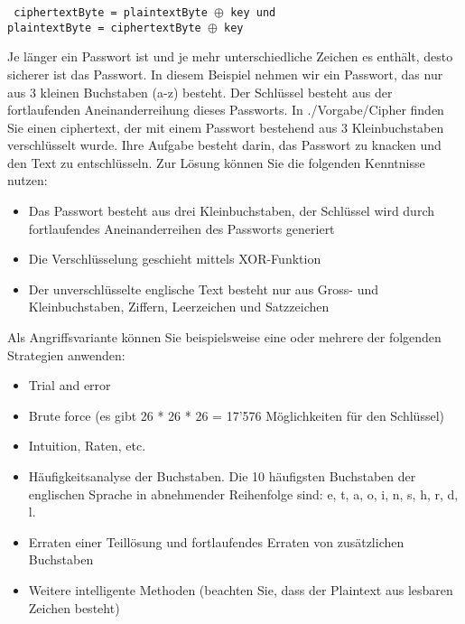 

\noindent
\texttt{
ciphertextByte = plaintextByte $\oplus$ key und \\
plaintextByte = ciphertextByte $\oplus$ key}

Je länger ein Passwort ist und je mehr unterschiedliche Zeichen es enthält, desto sicherer ist das Passwort.
In diesem Beispiel nehmen wir ein Passwort, das nur aus 3 kleinen Buchstaben (a-z) besteht. Der Schlüssel
besteht aus der fortlaufenden Aneinanderreihung dieses Passworts.
In ./Vorgabe/Cipher finden Sie einen ciphertext, der mit einem Passwort bestehend aus 3 Kleinbuchstaben
verschlüsselt wurde. Ihre Aufgabe besteht darin, das Passwort zu knacken und den Text zu entschlüsseln.
Zur Lösung können Sie die folgenden Kenntnisse nutzen:
\begin{itemize}
  \item Das Passwort besteht aus drei Kleinbuchstaben, der Schlüssel wird durch fortlaufendes Aneinanderreihen
  des Passworts generiert
  \item  Die Verschlüsselung geschieht mittels XOR-Funktion
  \item  Der unverschlüsselte englische Text besteht nur aus Gross- und Kleinbuchstaben, Ziffern, Leerzeichen
  und Satzzeichen
\end{itemize}

Als Angriffsvariante können Sie beispielsweise eine oder mehrere der folgenden Strategien anwenden:
\begin{itemize}
  \item Trial and error
  \item  Brute force (es gibt 26 * 26 * 26 = 17'576 Möglichkeiten für den Schlüssel)
  \item  Intuition, Raten, etc.
  \item  Häufigkeitsanalyse der Buchstaben. Die 10 häufigsten Buchstaben der englischen Sprache in abnehmender
  Reihenfolge sind: e, t, a, o, i, n, s, h, r, d, l.
  \item  Erraten einer Teillösung und fortlaufendes Erraten von zusätzlichen Buchstaben
  \item  Weitere intelligente Methoden (beachten Sie, dass der Plaintext aus lesbaren Zeichen besteht)
\end{itemize}
